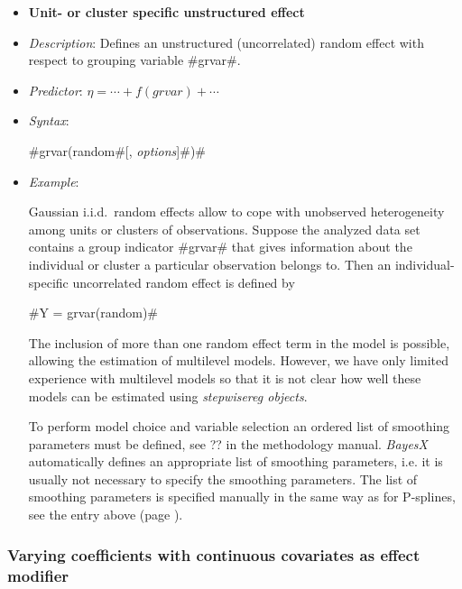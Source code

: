 \begin{itemize}
\item[]{\bf\sffamily Unit- or cluster specific unstructured
effect}

\item[] {\em Description}: Defines an unstructured (uncorrelated)
random effect with respect to grouping variable #grvar#. \item[]
{\em Predictor}: $\eta = \cdots + f(grvar) + \cdots$ \item[] {\em
Syntax}:

#grvar(random#[, {\em options}]#)#
\item[] {\em Example}:

Gaussian i.i.d.~random effects allow to cope with unobserved
heterogeneity among units or clusters of observations. Suppose the
analyzed data set contains a group indicator #grvar# that gives
information about the individual or cluster a particular
observation belongs to. Then an individual-specific uncorrelated
random effect is defined by

#Y = grvar(random)#

The inclusion of more than one random effect term in the model is
possible, allowing the estimation of multilevel models. However,
we have only limited experience with multilevel models so that it
is not clear how well these models can be estimated using {\em
stepwisereg objects}.


To perform model choice and variable selection an ordered list of smoothing parameters must be defined, see ??
in the methodology manual. {\em BayesX} automatically defines an appropriate list of smoothing parameters, i.e. it
is usually not necessary to  specify the smoothing parameters.
The list of smoothing parameters is specified manually in the same way as for P-splines,
see the entry above (page \pageref{psplines_stepwise}).
\end{itemize}

\subsubsection*{Varying coefficients with continuous covariates as
effect modifier}

